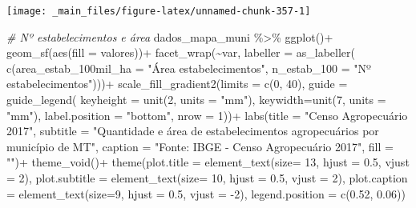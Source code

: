 \documentclass[
  brazilian,
]{book}
\newenvironment{Shaded}{\begin{snugshade}}{\end{snugshade}}
\newcommand{\AttributeTok}[1]{\textcolor[rgb]{0.77,0.63,0.00}{#1}}
\newcommand{\CommentTok}[1]{\textcolor[rgb]{0.56,0.35,0.01}{\textit{#1}}}
\newcommand{\DecValTok}[1]{\textcolor[rgb]{0.00,0.00,0.81}{#1}}
\newcommand{\FloatTok}[1]{\textcolor[rgb]{0.00,0.00,0.81}{#1}}
\newcommand{\FunctionTok}[1]{\textcolor[rgb]{0.00,0.00,0.00}{#1}}
\newcommand{\NormalTok}[1]{#1}
\newcommand{\SpecialCharTok}[1]{\textcolor[rgb]{0.00,0.00,0.00}{#1}}
\newcommand{\StringTok}[1]{\textcolor[rgb]{0.31,0.60,0.02}{#1}}
\begin{document}
\begin{center}\texttt{[image: \_main\_files/figure-latex/unnamed-chunk-357-1]} \end{center}

\begin{Shaded}
\begin{Highlighting}[]
\CommentTok{\# Nº estabelecimentos e área}
\NormalTok{dados\_mapa\_muni }\SpecialCharTok{\%\textgreater{}\%} 
  \FunctionTok{ggplot}\NormalTok{()}\SpecialCharTok{+}
  \FunctionTok{geom\_sf}\NormalTok{(}\FunctionTok{aes}\NormalTok{(}\AttributeTok{fill =}\NormalTok{ valores))}\SpecialCharTok{+}
  \FunctionTok{facet\_wrap}\NormalTok{(}\SpecialCharTok{\textasciitilde{}}\NormalTok{var,}
             \AttributeTok{labeller =} \FunctionTok{as\_labeller}\NormalTok{(}
               \FunctionTok{c}\NormalTok{(}\AttributeTok{area\_estab\_100mil\_ha =} \StringTok{"Área estabelecimentos"}\NormalTok{,}
                 \AttributeTok{n\_estab\_100 =} \StringTok{"Nº estabelecimentos"}\NormalTok{)))}\SpecialCharTok{+}
  \FunctionTok{scale\_fill\_gradient2}\NormalTok{(}\AttributeTok{limits =} \FunctionTok{c}\NormalTok{(}\DecValTok{0}\NormalTok{, }\DecValTok{40}\NormalTok{),}
                       \AttributeTok{guide =} \FunctionTok{guide\_legend}\NormalTok{(}
                         \AttributeTok{keyheight =} \FunctionTok{unit}\NormalTok{(}\DecValTok{2}\NormalTok{, }\AttributeTok{units =} \StringTok{"mm"}\NormalTok{),}
                         \AttributeTok{keywidth=}\FunctionTok{unit}\NormalTok{(}\DecValTok{7}\NormalTok{, }\AttributeTok{units =} \StringTok{"mm"}\NormalTok{),}
                         \AttributeTok{label.position =} \StringTok{"bottom"}\NormalTok{, }\AttributeTok{nrow =} \DecValTok{1}\NormalTok{))}\SpecialCharTok{+}
  \FunctionTok{labs}\NormalTok{(}\AttributeTok{title =} \StringTok{"Censo Agropecuário 2017"}\NormalTok{,}
       \AttributeTok{subtitle =} \StringTok{"Quantidade e área de estabelecimentos agropecuários por município de MT"}\NormalTok{,}
       \AttributeTok{caption =} \StringTok{"Fonte: IBGE {-} Censo Agropecuário 2017"}\NormalTok{,}
       \AttributeTok{fill =} \StringTok{""}\NormalTok{)}\SpecialCharTok{+}
  \FunctionTok{theme\_void}\NormalTok{()}\SpecialCharTok{+}
  \FunctionTok{theme}\NormalTok{(}\AttributeTok{plot.title =} \FunctionTok{element\_text}\NormalTok{(}\AttributeTok{size=} \DecValTok{13}\NormalTok{, }\AttributeTok{hjust =} \FloatTok{0.5}\NormalTok{, }\AttributeTok{vjust =} \DecValTok{2}\NormalTok{),}
        \AttributeTok{plot.subtitle =} \FunctionTok{element\_text}\NormalTok{(}\AttributeTok{size=} \DecValTok{10}\NormalTok{, }\AttributeTok{hjust =} \FloatTok{0.5}\NormalTok{, }\AttributeTok{vjust =} \DecValTok{2}\NormalTok{),}
        \AttributeTok{plot.caption =} \FunctionTok{element\_text}\NormalTok{(}\AttributeTok{size=}\DecValTok{9}\NormalTok{, }\AttributeTok{hjust =} \FloatTok{0.5}\NormalTok{, }\AttributeTok{vjust =} \SpecialCharTok{{-}}\DecValTok{2}\NormalTok{),}
        \AttributeTok{legend.position =} \FunctionTok{c}\NormalTok{(}\FloatTok{0.52}\NormalTok{, }\FloatTok{0.06}\NormalTok{))}
\end{Highlighting}
\end{Shaded}
\end{document}
